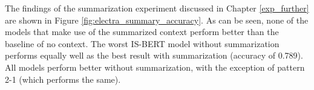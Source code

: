 The findings of the summarization experiment discussed in Chapter \ref{exp_further} are shown in Figure \ref{fig:electra_summary_accuracy}. As can be seen, none of the models that make use of the summarized context perform better than the baseline of no context. The worst IS-BERT model without summarization performs equally well as the best result with summarization (accuracy of 0.789). All models perform better without summarization, with the exception of pattern 2-1 (which performs the same).
